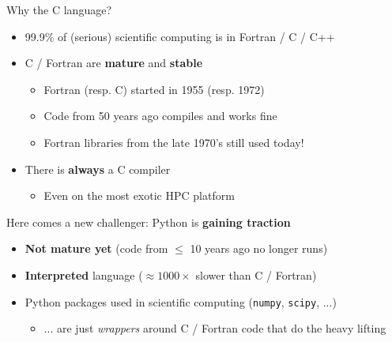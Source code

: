 \documentclass[10pt]{beamer}
\begin{document}
\begin{frame}
  \begin{block}{Why the C language?}
  \begin{itemize}
  \item 99.9\% of (serious) scientific computing is in Fortran / C / C++

    \medskip

  \item C / Fortran are \textbf{mature} and \textbf{stable}
    \begin{itemize}
    \item Fortran (resp. C) started in 1955 (resp. 1972)
    \item Code from 50 years ago compiles and works fine
    \item Fortran libraries from the late 1970's still used today!
    \end{itemize}

    \medskip

  \item There is \textbf{always} a C compiler
    \begin{itemize}
    \item Even on the most exotic HPC platform
    \end{itemize}    
  \end{itemize}
\end{block}

\begin{exampleblock}{Here comes a new challenger: Python is \textbf{gaining traction}}
  \begin{itemize}
  \item \textbf{Not mature yet} (code from $\leq$ 10 years ago \alert{no longer runs})
  \item \textbf{Interpreted} language ($\approx 1000\times$ \alert{slower} than C / Fortran)
  \item Python packages used in scientific computing (\texttt{numpy}, \texttt{scipy}, ...)
    \begin{itemize}
    \item ... are just \emph{wrappers} around C / Fortran code that do the heavy lifting
    \end{itemize}
  \end{itemize}
\end{exampleblock}
\end{frame}

\end{document}
